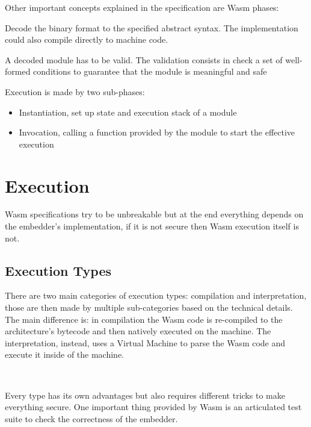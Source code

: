 Other important concepts explained in the specification are Wasm phases:

\begin{description}[font=$\bullet$ \scshape\bfseries]
  \item[Decoding]
        Decode the binary format to the specified abstract syntax. The implementation could also compile directly to machine code.
  \item[Validation]
        A decoded module has to be valid. The validation consists in check a set of well-formed conditions to guarantee that the module is meaningful and safe ~\cite{wasm-polkadot-wiki}
  \item[Execution]
        Execution is made by two sub-phases:
        \begin{itemize}
          \item Instantiation, set up state and execution stack of a module
          \item Invocation, calling a function provided by the module to start the effective execution
        \end{itemize}
\end{description}

\section{Execution}

Wasm specifications try to be unbreakable but at the end everything depends on the embedder's implementation, if it is not secure then Wasm execution itself is not.

\subsection{Execution Types}

There are two main categories of execution types: compilation and interpretation, those are then made by multiple sub-categories based on the technical details. The main difference is: in compilation the Wasm code is re-compiled to the architecture's bytecode and then natively executed on the machine. The interpretation, instead, uses a Virtual Machine to parse the Wasm code and execute it inside of the machine.

\

Every type has its own advantages but also requires different tricks to make everything secure. One important thing provided by Wasm is an articulated test suite to check the correctness of the embedder.~\cite{wasm-testsuite}

